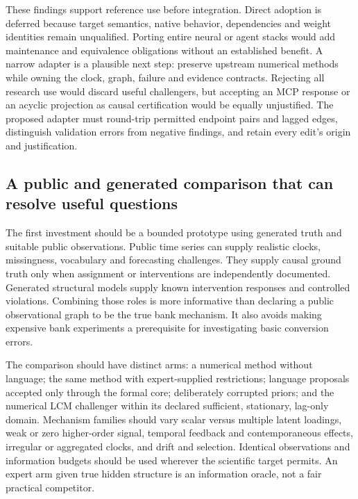 These findings support reference use before integration. Direct adoption is
deferred because target semantics, native behavior, dependencies and weight
identities remain unqualified. Porting entire neural or agent stacks would
add maintenance and equivalence obligations without an established benefit.
A narrow adapter is a plausible next step: preserve upstream numerical
methods while owning the clock, graph, failure and evidence contracts.
Rejecting all research use would discard useful challengers, but accepting
an MCP response or an acyclic projection as causal certification would be
equally unjustified. The proposed adapter must round-trip permitted endpoint
pairs and lagged edges, distinguish validation errors from negative findings,
and retain every edit's origin and justification.
\citep{exec15_latent_design}

\subsection{A public and generated comparison that can resolve useful questions}

The first investment should be a bounded prototype using generated truth
and suitable public observations. Public time series can supply realistic
clocks, missingness, vocabulary and forecasting challenges. They supply
causal ground truth only when assignment or interventions are independently
documented. Generated structural models supply known intervention responses
and controlled violations. Combining those roles is more informative than
declaring a public observational graph to be the true bank mechanism.
It also avoids making expensive bank experiments a prerequisite for
investigating basic conversion errors.
\citep{exec15_latent_design}

The comparison should have distinct arms: a numerical method without
language; the same method with expert-supplied restrictions; language
proposals accepted only through the formal core; deliberately corrupted
priors; and the numerical LCM challenger within its declared sufficient,
stationary, lag-only domain. Mechanism families should vary scalar versus
multiple latent loadings, weak or zero higher-order signal, temporal
feedback and contemporaneous effects, irregular or aggregated clocks, and
drift and selection. Identical observations and information budgets should
be used wherever the scientific target permits. An expert arm given true
hidden structure is an information oracle, not a fair practical competitor.
\citep{exec15_latent_design}

